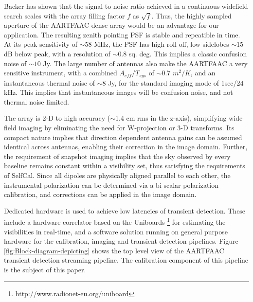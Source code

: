 \documentclass{aa}
\begin{document}
Backer \citep{backer1999pers} has shown that  the signal to noise ratio achieved
in a  continuous widefield search  scales with the  array filling factor  $f$ as
$\sqrt{f}$. Thus, the highly sampled  aperture of the AARTFAAC dense array would
be an advantage for our application. The resulting zenith pointing PSF is stable
and repeatible in  time. At its peak sensitivity of $\sim$$58$  MHz, the PSF has
high  roll-off, low sidelobes  $\sim$$15$ dB  below peak,  with a  resolution of
$\sim$$0.8$  sq.  deg.  This implies  a  classic confusion  noise of  $\sim$$10$
Jy.  The large  number  of antennas  also  make the  AARTFAAC  a very  sensitive
instrument,     with    a     combined     $A_{eff}/T_{sys}$    of     $\sim$0.7
$m^{2}/K$\citep{wijnholds2011situ},  and  an   instantaneous  thermal  noise  of
$\sim$8 Jy,  for the standard  imaging mode of  1sec/24 kHz.  This  implies that
instantaneous images will be confusion noise, and not thermal noise limited.

The array is 2-D to high  accuracy ($\sim$1.4 cm rms in the z-axis), simplifying
wide field imaging  by eliminating the need for  W-projection or 3-D transforms.
Its compact nature implies that direction dependent antenna gains can be assumed
identical  across  antennas, enabling  their  correction  in  the image  domain.
Further, the  requirement of snapshot imaging  implies that the  sky observed by
every baseline  remains constant  within a visibility  set, thus  satisfying the
requirements of  SelfCal. Since all  dipoles are physically aligned  parallel to
each  other, the  instrumental polarization  can be  determined via  a bi-scalar
polarization calibration, and corrections can be applied in the image domain.

Dedicated  hardware is  used to  achieve low  latencies of  transient detection.
These      include     a      hardware     correlator      based      on     the
Uniboards  \footnote{http://www.radionet-eu.org/uniboard}   for  estimating  the
visibilities in  real-time, and a  software solution running on  general purpose
hardware for the calibration, imaging and transient detection pipelines.  Figure
\ref{fig:Block-diagram-depicting}  shows  the top  level  view  of the  AARTFAAC
transient  detection  streaming pipeline.   The  calibration  component of  this
pipeline is the subject of this paper.

\end{document}
